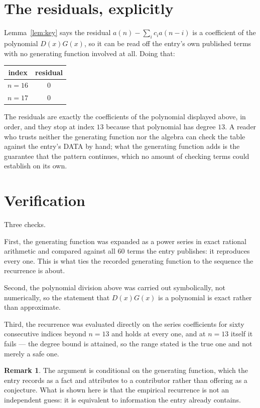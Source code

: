 \documentclass[11pt,a4paper]{article}
\theoremstyle{plain}
\theoremstyle{definition}
\newtheorem{remark}[theorem]{Remark}
\begin{document}
\section{The residuals, explicitly}

Lemma~\ref{lem:key} says the residual $a(n)-\sum_ic_ia(n-i)$ is a coefficient of the
polynomial $D(x)G(x)$, so it can be read off the entry's own published terms with no
generating function involved at all. Doing that:
\begin{center}
\begin{tabular}{cc}
index & residual \\ \hline
$n=16$ & $0$ \\
$n=17$ & $0$
\end{tabular}
\end{center}
The residuals are exactly the coefficients of the polynomial displayed above, in order, and
they stop at index $13$ because that polynomial has degree $13$. A reader who trusts
neither the generating function nor the algebra can check the table against the entry's DATA
by hand; what the generating function adds is the guarantee that the pattern continues, which
no amount of checking terms could establish on its own.

\section{Verification}

Three checks.

First, the generating function was expanded as a power series in exact rational arithmetic and
compared against all $60$ terms the entry publishes: it reproduces every one. This is
what ties the recorded generating function to the sequence the recurrence is about.

Second, the polynomial division above was carried out symbolically, not numerically, so the
statement that $D(x)G(x)$ is a polynomial is exact rather than approximate.

Third, the recurrence was evaluated directly on the series coefficients for sixty consecutive
indices beyond $n=13$ and holds at every one, and at $n=13$ itself it fails --- the
degree bound is attained, so the range stated is the true one and not merely a safe one.

\begin{remark}
The argument is conditional on the generating function, which the entry records as a fact and
attributes to a contributor rather than offering as a conjecture. What is shown here is that
the empirical recurrence is not an independent guess: it is equivalent to information the
entry already contains.
\end{remark}
\end{document}
